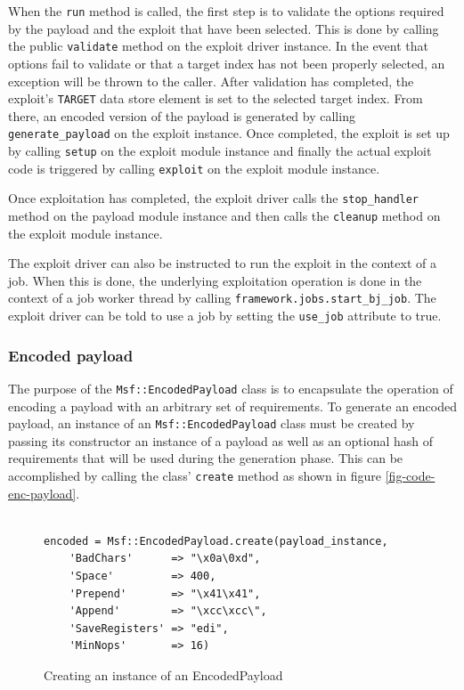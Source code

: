 \documentclass{report}
\begin{document}
\par
When the \texttt{run} method is called, the first step is to
validate the options required by the payload and the exploit that
have been selected.  This is done by calling the public
\texttt{validate} method on the exploit driver instance.  In the
event that options fail to validate or that a target index has not
been properly selected, an exception will be thrown to the caller.
After validation has completed, the exploit's \texttt{TARGET} data
store element is set to the selected target index.  From there, an
encoded version of the payload is generated by calling
\texttt{generate\_payload} on the exploit instance.  Once completed,
the exploit is set up by calling \texttt{setup} on the exploit
module instance and finally the actual exploit code is triggered by
calling \texttt{exploit} on the exploit module instance.

\par
Once exploitation has completed, the exploit driver calls the
\texttt{stop\_handler} method on the payload module instance and
then calls the \texttt{cleanup} method on the exploit module
instance.

\par
The exploit driver can also be instructed to run the exploit in the
context of a job.  When this is done, the underlying exploitation
operation is done in the context of a job worker thread by calling
\texttt{framework.jobs.start\_bj\_job}.  The exploit driver can be
told to use a job by setting the \texttt{use\_job} attribute to
true.

            \subsubsection{Encoded payload}

\par
The purpose of the \texttt{Msf::EncodedPayload} class is to
encapsulate the operation of encoding a payload with an arbitrary
set of requirements.  To generate an encoded payload, an instance of
an \texttt{Msf::EncodedPayload} class must be created by passing its
constructor an instance of a payload as well as an optional hash of
requirements that will be used during the generation phase.  This
can be accomplished by calling the class' \texttt{create} method as
shown in figure \ref{fig-code-enc-payload}.


\begin{figure}[h]
\begin{verbatim}

encoded = Msf::EncodedPayload.create(payload_instance,
    'BadChars'      => "\x0a\0xd",
    'Space'         => 400,
    'Prepend'       => "\x41\x41",
    'Append'        => "\xcc\xcc\",
    'SaveRegisters' => "edi",
    'MinNops'       => 16)
\end{verbatim}
\caption{Creating an instance of an EncodedPayload}
\label{fig-code-exploit-driver}
\end{figure}
\end{document}
